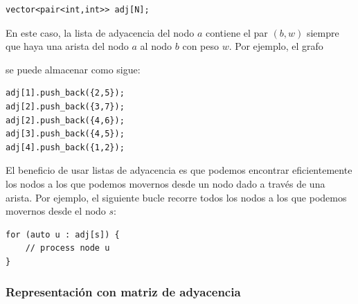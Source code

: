 \begin{lstlisting}
vector<pair<int,int>> adj[N];
\end{lstlisting}

En este caso, la lista de adyacencia del nodo $a$
contiene el par $(b,w)$
siempre que haya una arista del nodo $a$ al nodo $b$
con peso $w$. Por ejemplo, el grafo

\begin{center}
\end{center}
se puede almacenar como sigue:
\begin{lstlisting}
adj[1].push_back({2,5});
adj[2].push_back({3,7});
adj[2].push_back({4,6});
adj[3].push_back({4,5});
adj[4].push_back({1,2});
\end{lstlisting}

El beneficio de usar listas de adyacencia es que
podemos encontrar eficientemente los nodos a los que
podemos movernos desde un nodo dado a través de una arista.
Por ejemplo, el siguiente bucle recorre todos los nodos
a los que podemos movernos desde el nodo $s$:

\begin{lstlisting}
for (auto u : adj[s]) {
    // process node u
}
\end{lstlisting}

\subsubsection{Representación con matriz de adyacencia}



